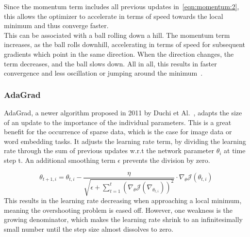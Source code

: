 Since the momentum term includes all previous updates in~\ref{eqn:momentum:2}, this allows the optimizer to accelerate in terms of speed towards
the local minimum and thus converge faster.\\
This can be associated with a ball rolling down a hill.
The momentum term increases, as the ball rolls downhill, accelerating in terms of speed for subsequent gradients
which point in the same direction.
When the direction changes, the term decreases, and the ball slows down.
All in all, this results in faster convergence and less oscillation or jumping around the minimum~\cite{optimizersoverview}.

\subsubsection{\gls{AdaGrad}}
\gls{AdaGrad}, a newer algorithm proposed in 2011 by Duchi et Al.~\cite{adagrad},
adapts the size of an update to the importance of the individual parameters.
This is a great benefit for the occurrence of sparse data, which is the case for image data or word embedding tasks.
It adjusts the learning rate term, by dividing the learning rate through the sum
of previous updates w.r.t the network parameter $\theta_i$ at time step t.
An additional smoothing term $\epsilon$ prevents the division by zero.

\begin{equation}
    \theta_{t+1,i} = \theta_{t,i} - \frac{\eta}{\sqrt{\epsilon+\sum_{t=1}^{t}(\nabla_\theta\mathcal{J}(\nabla_{\theta_{t,i}}))^2}} \cdot \nabla_\theta\mathcal{J}(\theta_{t,i})
    \label{eqn:adagrad}
\end{equation}
This results in the learning rate decreasing when approaching a local minimum, meaning the overshooting problem is eased off.
However, one weakness is the growing denominator, which makes the learning rate shrink to an infinitesimally small number until the step
size almost dissolves to zero.

